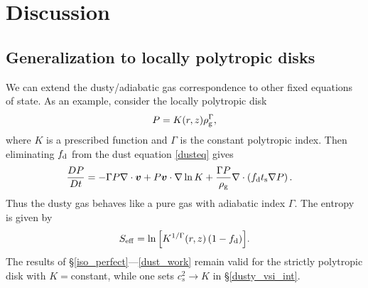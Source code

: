 \section{Discussion}\label{discussion}








\subsection{Generalization to locally polytropic disks}\label{gen_poly}

We can extend the dusty/adiabatic gas correspondence to 
other fixed equations of state. As an example, consider the locally
polytropic disk 
\begin{align}
  P = K(r,z)\rho_\mathrm{g}^{\Gamma}, 
\end{align}
where $K$ is a prescribed function and $\Gamma$ is the constant
polytropic index. Then eliminating $f_\mathrm{d}$ from the dust equation
\ref{dusteq} gives 
\begin{align}\label{poly_energy}
  \frac{D P}{D t} &= - \Gamma P\nabla\cdot\bm{v}  + P \bm{v}\cdot\nabla
  \ln{K} + \frac{\Gamma P}{\rho_\mathrm{g}}\nabla\cdot\left(f_\mathrm{d}t_\mathrm{s}\nabla
  P\right). 
\end{align}
Thus the dusty gas behaves like a pure gas with adiabatic index
$\Gamma$. The entropy is given by 
\begin{align}
  S_\mathrm{eff} = \ln{\left[K^{1/\Gamma}(r,z)\left(1 - f_\mathrm{d}\right)\right]}.  
\end{align}
The results of \S\ref{iso_perfect}---\ref{dust_work} remain valid for the strictly 
polytropic disk with $K=$constant, while one sets $c_s^2\to K$ in
\S\ref{dusty_vsi_int}. 




